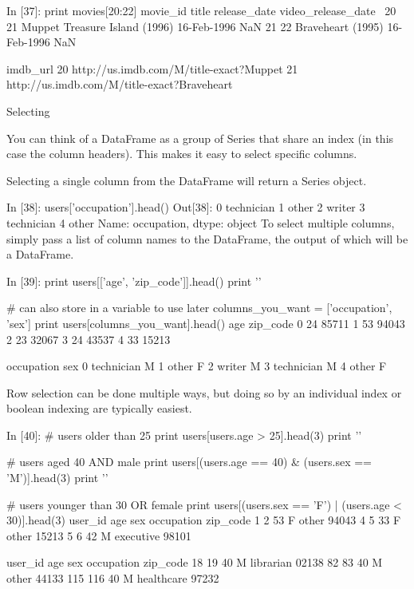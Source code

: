In [37]:
print movies[20:22]
    movie_id                          title release_date  video_release_date  \
20        21  Muppet Treasure Island (1996)  16-Feb-1996                 NaN   
21        22              Braveheart (1995)  16-Feb-1996                 NaN   

                                             imdb_url  
20  http://us.imdb.com/M/title-exact?Muppet%
21  http://us.imdb.com/M/title-exact?Braveheart%

Selecting

You can think of a DataFrame as a group of Series that share an index (in this case the column headers). This makes it easy to select specific columns.

Selecting a single column from the DataFrame will return a Series object.

In [38]:
users['occupation'].head()
Out[38]:
0    technician
1         other
2        writer
3    technician
4         other
Name: occupation, dtype: object
To select multiple columns, simply pass a list of column names to the DataFrame, the output of which will be a DataFrame.

In [39]:
print users[['age', 'zip_code']].head()
print '\n'

# can also store in a variable to use later
columns_you_want = ['occupation', 'sex'] 
print users[columns_you_want].head()
   age zip_code
0   24    85711
1   53    94043
2   23    32067
3   24    43537
4   33    15213


   occupation sex
0  technician   M
1       other   F
2      writer   M
3  technician   M
4       other   F

Row selection can be done multiple ways, but doing so by an individual index or boolean indexing are typically easiest.

In [40]:
# users older than 25
print users[users.age > 25].head(3)
print '\n'

# users aged 40 AND male
print users[(users.age == 40) & (users.sex == 'M')].head(3)
print '\n'

# users younger than 30 OR female
print users[(users.sex == 'F') | (users.age < 30)].head(3)
   user_id  age sex occupation zip_code
1        2   53   F      other    94043
4        5   33   F      other    15213
5        6   42   M  executive    98101


     user_id  age sex  occupation zip_code
18        19   40   M   librarian    02138
82        83   40   M       other    44133
115      116   40   M  healthcare    97232


